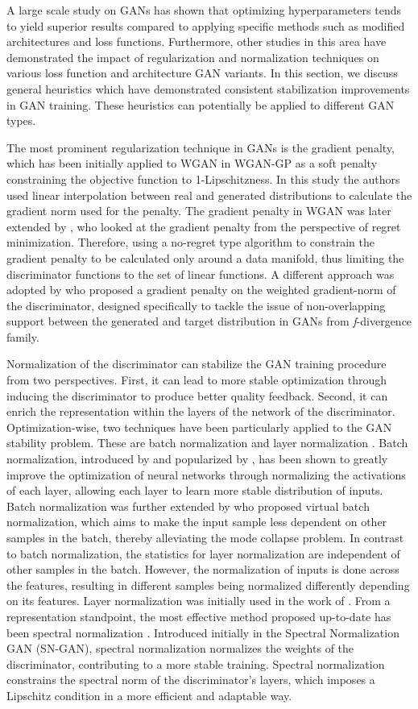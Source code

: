 \label{sec:trainstab}
A large scale study on GANs  has shown that optimizing hyperparameters tends to yield superior results compared to applying specific methods such as modified architectures and loss functions. Furthermore, other studies in this area  have demonstrated the impact of regularization and normalization techniques on various loss function and architecture GAN variants. In this section, we discuss general heuristics which have demonstrated consistent stabilization improvements in GAN training. These heuristics can potentially be applied to different GAN types.

The most prominent regularization technique in GANs is the gradient penalty, which has been initially applied to WGAN in WGAN-GP  as a soft penalty constraining the objective function to 1-Lipschitzness. In this study the authors used linear interpolation between real and generated distributions to calculate the gradient norm used for the penalty. The gradient penalty in WGAN was later extended by , who looked at the gradient penalty from the perspective of regret minimization. Therefore, using a no-regret type algorithm to constrain the gradient penalty to be calculated only around a data manifold, thus limiting the discriminator functions to the set of linear functions. A different approach was adopted by  who proposed a gradient penalty on the weighted gradient-norm of the discriminator, designed specifically to tackle the issue of non-overlapping support between the generated and target distribution in GANs from \textit{f}-divergence family.

Normalization of the discriminator can stabilize the GAN training procedure from two perspectives. First, it can lead to more stable optimization through inducing the discriminator to produce better quality feedback. Second, it can enrich the representation within the layers of the network of the discriminator.
Optimization-wise, two techniques have been particularly applied to the GAN stability problem. These are batch normalization  and layer normalization . Batch normalization, introduced by  and popularized by , has been shown to greatly improve the optimization of neural networks through normalizing the activations of each layer, allowing each layer to learn more stable distribution of inputs. Batch normalization was further extended by  who proposed virtual batch normalization, which aims to make the input sample less dependent on other samples in the batch, thereby alleviating the mode collapse problem. In contrast to batch normalization, the statistics for layer normalization  are independent of other samples in the batch. However, the normalization of inputs is done across the features, resulting in different samples being normalized differently depending on its features. Layer normalization was initially used in the work of .
From a representation standpoint, the most effective method proposed up-to-date has been spectral normalization . Introduced initially in the Spectral Normalization GAN (SN-GAN), spectral normalization normalizes the weights of the discriminator, contributing to a more stable training. Spectral normalization constrains the spectral norm of the discriminator's layers, which imposes a Lipschitz condition in a more efficient and adaptable way.

